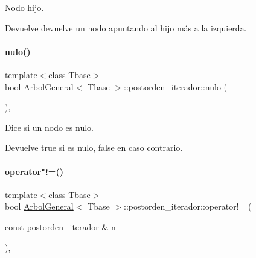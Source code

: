 Nodo hijo. 

\begin{DoxyReturn}{Devuelve}
devuelve un nodo apuntando al hijo más a la izquierda. 
\end{DoxyReturn}
\hypertarget{classArbolGeneral_1_1postorden__iterador_a68390390c83bf6e26d9ea74d547f1b2c}{}\label{classArbolGeneral_1_1postorden__iterador_a68390390c83bf6e26d9ea74d547f1b2c} 
\paragraph{\texorpdfstring{nulo()}{nulo()}}
{\footnotesize\ttfamily template$<$class Tbase$>$ \\
bool \hyperlink{classArbolGeneral}{Arbol\+General}$<$ Tbase $>$\+::postorden\+\_\+iterador\+::nulo (\begin{DoxyParamCaption}{ }\end{DoxyParamCaption})\hspace{0.3cm}{\ttfamily [inline]}, {\ttfamily [private]}}



Dice si un nodo es nulo. 

\begin{DoxyReturn}{Devuelve}
true si es nulo, false en caso contrario. 
\end{DoxyReturn}
\hypertarget{classArbolGeneral_1_1postorden__iterador_a15ce3ad6eded0487e0b2b5a49abde5ce}{}\label{classArbolGeneral_1_1postorden__iterador_a15ce3ad6eded0487e0b2b5a49abde5ce} 
\paragraph{\texorpdfstring{operator"!=()}{operator!=()}}
{\footnotesize\ttfamily template$<$class Tbase$>$ \\
bool \hyperlink{classArbolGeneral}{Arbol\+General}$<$ Tbase $>$\+::postorden\+\_\+iterador\+::operator!= (\begin{DoxyParamCaption}\item[{const \hyperlink{classArbolGeneral_1_1postorden__iterador}{postorden\+\_\+iterador} \&}]{n }\end{DoxyParamCaption})\hspace{0.3cm}{\ttfamily [inline]}, {\ttfamily [private]}}



